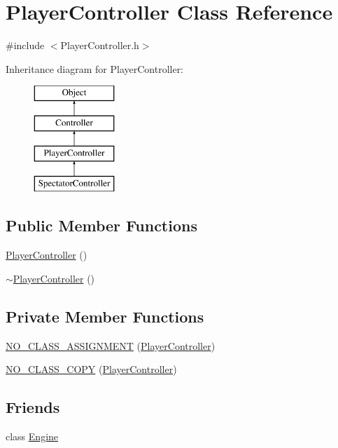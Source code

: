 \section{Player\-Controller Class Reference}
\label{class_player_controller}


{\ttfamily \#include $<$Player\-Controller.\-h$>$}

Inheritance diagram for Player\-Controller\-:\begin{figure}[H]
\begin{center}
\leavevmode
\includegraphics[height=4.000000cm]{class_player_controller}
\end{center}
\end{figure}
\subsection*{Public Member Functions}
\begin{DoxyCompactItemize}
\item 
\hyperlink{class_player_controller_af2d4e93f407c9cd40a5de9f14cbeadec}{Player\-Controller} ()
\item 
\hyperlink{class_player_controller_a27b597bc2dbe06e2464dea6cdb3fac96}{$\sim$\-Player\-Controller} ()
\end{DoxyCompactItemize}
\subsection*{Private Member Functions}
\begin{DoxyCompactItemize}
\item 
\hyperlink{class_player_controller_a900d26de3ea057dea5c2bdd51fee778c}{N\-O\-\_\-\-C\-L\-A\-S\-S\-\_\-\-A\-S\-S\-I\-G\-N\-M\-E\-N\-T} (\hyperlink{class_player_controller}{Player\-Controller})
\item 
\hyperlink{class_player_controller_a1073aca166c16fe349d78eb157cfb32f}{N\-O\-\_\-\-C\-L\-A\-S\-S\-\_\-\-C\-O\-P\-Y} (\hyperlink{class_player_controller}{Player\-Controller})
\end{DoxyCompactItemize}
\subsection*{Friends}
\begin{DoxyCompactItemize}
\item 
class \hyperlink{class_player_controller_a3e1914489e4bed4f9f23cdeab34a43dc}{Engine}
\end{DoxyCompactItemize}


